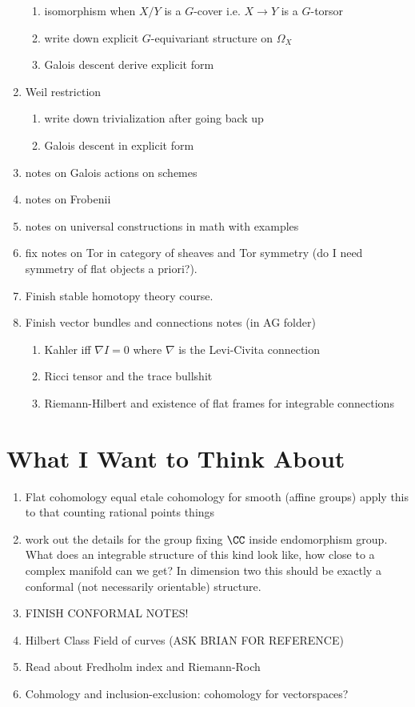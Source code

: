 \documentclass[12pt]{article}
\begin{document}
\begin{enumerate}
\begin{enumerate}
\item isomorphism when $X/Y$ is a $G$-cover i.e. $X \to Y$ is a $G$-torsor
\item write down explicit $G$-equivariant structure on $\Omega_X$
\item Galois descent derive explicit form
\end{enumerate}
\item Weil restriction
\begin{enumerate}
\item write down trivialization after going back up
\item Galois descent in explicit form
\end{enumerate}
\item notes on Galois actions on schemes
\item notes on Frobenii
\item notes on universal constructions in math with examples

\item fix notes on Tor in category of sheaves and Tor symmetry (do I need symmetry of flat objects a priori?).

\item Finish stable homotopy theory course.

\item Finish vector bundles and connections notes (in AG folder)
\begin{enumerate}
\item Kahler iff $\nabla I = 0$ where $\nabla$ is the Levi-Civita connection
\item Ricci tensor and the trace bullshit 
\item Riemann-Hilbert and existence of flat frames for integrable connections
\end{enumerate}
\end{enumerate}

\section{What I Want to Think About}

\begin{enumerate}
\item Flat cohomology equal etale cohomology for smooth (affine groups) apply this to that counting rational points things
\item work out the details for the group fixing $\CC$ inside endomorphism group. What does an integrable structure of this kind look like, how close to a complex manifold can we get? In dimension two this should be exactly a conformal (not necessarily orientable) structure. 
\item FINISH CONFORMAL NOTES!
\item Hilbert Class Field of curves (ASK BRIAN FOR REFERENCE)
\item Read about Fredholm index and Riemann-Roch
\item Cohmology and inclusion-exclusion: cohomology for vectorspaces?
\end{enumerate}
\end{document}
